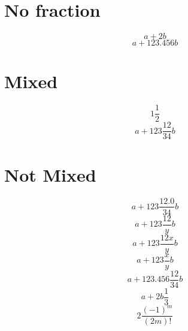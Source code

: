 \documentclass{article}
\begin{document}
\section{No fraction}
\[ a+2 b\]
\[ a+123.456 b\]
\section{Mixed}
\[ 1\frac{1}{2} \]
\[ a+123\frac{12}{34} b\]
\section{Not Mixed}
\[ a+123\frac{12.0}{34} b\]
\[ a+123\frac{12}{y} b\]
\[ a+123\frac{12x}{y} b\]
\[ a+123\frac{x}{y} b\]
\[ a+123.456\frac{12}{34} b\]
\[ a+2 b \frac{1}{3}\]
\[ 2\frac{(-1)^m}{(2m)!} \]
\end{document}
